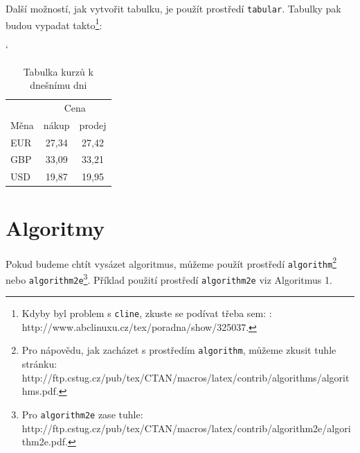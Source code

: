 \documentclass[11pt,a4paper]{article}
\begin{document}
      Další možností, jak vytvořit tabulku, je použít prostředí \texttt{tabular}. Tabulky pak budou vypadat takto\footnote{Kdyby byl problem s \texttt{cline}, zkuste se podívat třeba sem: : http://www.abclinuxu.cz/tex/poradna/show/325037.}:

   
        \begin{table}[h]
        \centering
        \catcode`
          \begin{tabular}{|l|c|c|}
            \hline
             & \multicolumn{2}{|c|}{Cena}  \\ 
            \cline{2-3}
            Měna & nákup & prodej \\
            \hline
            EUR & 27,34 & 27,42 \\
            GBP & 33,09 & 33,21 \\
            USD & 19,87 & 19,95 \\
            \hline

          \end{tabular}
          \caption{Tabulka kurzů k dnešnímu dni}


\end{table}
\pagebreak

  \section{Algoritmy}

  Pokud budeme chtít vysázet algoritmus, můžeme použít prostředí \texttt{algorithm}\footnote{Pro nápovědu, jak zacházet s prostředím \texttt{algorithm}, můžeme zkusit tuhle stránku: \\http://ftp.cstug.cz/pub/tex/CTAN/macros/latex/contrib/algorithms/algorithms.pdf.} nebo \texttt{algorithm2e}\footnote{Pro \texttt{algorithm2e} zase tuhle: http://ftp.cstug.cz/pub/tex/CTAN/macros/latex/contrib/algorithm2e/algorithm2e.pdf.}. Příklad použití prostředí \texttt{algorithm2e} viz Algoritmus 1.
\end{document}
